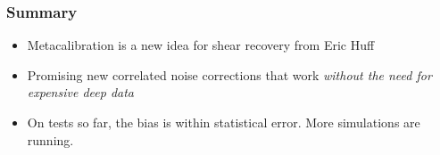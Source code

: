 \documentclass{beamer}
\begin{document}
\frame
{
    \frametitle{Summary}

 
    \begin{itemize}
        \item Metacalibration is a new idea for shear recovery from
            Eric Huff

        \item Promising new correlated noise corrections that work {\color{gold} {\em without the need
            for expensive deep data} }

        \item On tests so far, the bias is within statistical error.  More simulations are running.
        
    \end{itemize}

}
\end{document}

